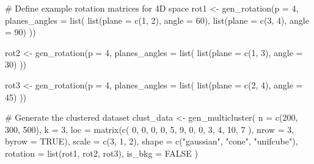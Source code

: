 \documentclass[
  11pt,
  a4paper,
]{report}
\newenvironment{Shaded}{\begin{snugshade}}{\end{snugshade}}
\newcommand{\AttributeTok}[1]{\textcolor[rgb]{0.40,0.45,0.13}{#1}}
\newcommand{\CommentTok}[1]{\textcolor[rgb]{0.37,0.37,0.37}{#1}}
\newcommand{\ConstantTok}[1]{\textcolor[rgb]{0.56,0.35,0.01}{#1}}
\newcommand{\DecValTok}[1]{\textcolor[rgb]{0.68,0.00,0.00}{#1}}
\newcommand{\FunctionTok}[1]{\textcolor[rgb]{0.28,0.35,0.67}{#1}}
\newcommand{\NormalTok}[1]{\textcolor[rgb]{0.00,0.23,0.31}{#1}}
\newcommand{\OtherTok}[1]{\textcolor[rgb]{0.00,0.23,0.31}{#1}}
\newcommand{\StringTok}[1]{\textcolor[rgb]{0.13,0.47,0.30}{#1}}
\begin{document}
\begin{Shaded}
\begin{Highlighting}[]
\CommentTok{\# Define example rotation matrices for 4D space}
\NormalTok{rot1 }\OtherTok{\textless{}{-}} \FunctionTok{gen\_rotation}\NormalTok{(}\AttributeTok{p =} \DecValTok{4}\NormalTok{, }\AttributeTok{planes\_angles =} \FunctionTok{list}\NormalTok{(}
  \FunctionTok{list}\NormalTok{(}\AttributeTok{plane =} \FunctionTok{c}\NormalTok{(}\DecValTok{1}\NormalTok{, }\DecValTok{2}\NormalTok{), }\AttributeTok{angle =} \DecValTok{60}\NormalTok{),}
  \FunctionTok{list}\NormalTok{(}\AttributeTok{plane =} \FunctionTok{c}\NormalTok{(}\DecValTok{3}\NormalTok{, }\DecValTok{4}\NormalTok{), }\AttributeTok{angle =} \DecValTok{90}\NormalTok{)}
\NormalTok{))}

\NormalTok{rot2 }\OtherTok{\textless{}{-}} \FunctionTok{gen\_rotation}\NormalTok{(}\AttributeTok{p =} \DecValTok{4}\NormalTok{, }\AttributeTok{planes\_angles =} \FunctionTok{list}\NormalTok{(}
  \FunctionTok{list}\NormalTok{(}\AttributeTok{plane =} \FunctionTok{c}\NormalTok{(}\DecValTok{1}\NormalTok{, }\DecValTok{3}\NormalTok{), }\AttributeTok{angle =} \DecValTok{30}\NormalTok{)}
\NormalTok{))}

\NormalTok{rot3 }\OtherTok{\textless{}{-}} \FunctionTok{gen\_rotation}\NormalTok{(}\AttributeTok{p =} \DecValTok{4}\NormalTok{, }\AttributeTok{planes\_angles =} \FunctionTok{list}\NormalTok{(}
  \FunctionTok{list}\NormalTok{(}\AttributeTok{plane =} \FunctionTok{c}\NormalTok{(}\DecValTok{2}\NormalTok{, }\DecValTok{4}\NormalTok{), }\AttributeTok{angle =} \DecValTok{45}\NormalTok{)}
\NormalTok{))}

\CommentTok{\# Generate the clustered dataset}
\NormalTok{clust\_data }\OtherTok{\textless{}{-}} \FunctionTok{gen\_multicluster}\NormalTok{(}
  \AttributeTok{n =} \FunctionTok{c}\NormalTok{(}\DecValTok{200}\NormalTok{, }\DecValTok{300}\NormalTok{, }\DecValTok{500}\NormalTok{),}
  \AttributeTok{k =} \DecValTok{3}\NormalTok{,}
  \AttributeTok{loc =} \FunctionTok{matrix}\NormalTok{(}\FunctionTok{c}\NormalTok{(}
    \DecValTok{0}\NormalTok{, }\DecValTok{0}\NormalTok{, }\DecValTok{0}\NormalTok{, }\DecValTok{0}\NormalTok{,}
    \DecValTok{5}\NormalTok{, }\DecValTok{9}\NormalTok{, }\DecValTok{0}\NormalTok{, }\DecValTok{0}\NormalTok{,}
    \DecValTok{3}\NormalTok{, }\DecValTok{4}\NormalTok{, }\DecValTok{10}\NormalTok{, }\DecValTok{7}
\NormalTok{  ), }\AttributeTok{nrow =} \DecValTok{3}\NormalTok{, }\AttributeTok{byrow =} \ConstantTok{TRUE}\NormalTok{),}
  \AttributeTok{scale =} \FunctionTok{c}\NormalTok{(}\DecValTok{3}\NormalTok{, }\DecValTok{1}\NormalTok{, }\DecValTok{2}\NormalTok{),}
  \AttributeTok{shape =} \FunctionTok{c}\NormalTok{(}\StringTok{"gaussian"}\NormalTok{, }\StringTok{"cone"}\NormalTok{, }\StringTok{"unifcube"}\NormalTok{),}
  \AttributeTok{rotation =} \FunctionTok{list}\NormalTok{(rot1, rot2, rot3),}
  \AttributeTok{is\_bkg =} \ConstantTok{FALSE}
\NormalTok{)}
\end{Highlighting}
\end{Shaded}
\end{document}
